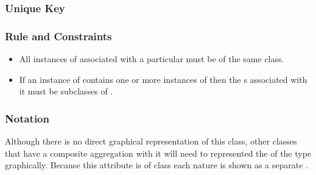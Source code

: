 \subsubsection{Unique Key}

\begin{logicalkey}
  \item {}
  \item {}
\end{logicalkey}

\subsubsection{Rule and Constraints}

\begin{itemize}
\item All instances of  associated with a
  particular  must be of the same class.
\item If an instance of  contains one or more
  instances of  then the
  s associated with it must be subclasses of
  .
\end{itemize}

\subsubsection{Notation}

Although there is no direct graphical representation of this class,
other classes that have a composite aggregation with it will need to
represented the  of the type graphically. Because this
attribute is of class  each nature is shown
as a separate . 





